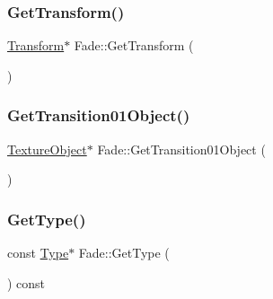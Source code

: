 \mbox{\label{class_fade_a1a177209e72a27858ceb2d339321e9c4}} 
\subsubsection{\texorpdfstring{Get\+Transform()}{GetTransform()}}
{\footnotesize\ttfamily \mbox{\hyperlink{class_transform}{Transform}}$\ast$ Fade\+::\+Get\+Transform (\begin{DoxyParamCaption}{ }\end{DoxyParamCaption})\hspace{0.3cm}{\ttfamily [inline]}}

\mbox{\label{class_fade_a4e047c532d430095e7d0d70288289a82}} 
\subsubsection{\texorpdfstring{Get\+Transition01\+Object()}{GetTransition01Object()}}
{\footnotesize\ttfamily \mbox{\hyperlink{class_texture_object}{Texture\+Object}}$\ast$ Fade\+::\+Get\+Transition01\+Object (\begin{DoxyParamCaption}{ }\end{DoxyParamCaption})\hspace{0.3cm}{\ttfamily [inline]}}

\mbox{\label{class_fade_aed5a29d39a5fd6161a9aed73d5f30870}} 
\subsubsection{\texorpdfstring{Get\+Type()}{GetType()}}
{\footnotesize\ttfamily const \mbox{\hyperlink{class_fade_ac06f27215b454aa05b93c236476d6e80}{Type}}$\ast$ Fade\+::\+Get\+Type (\begin{DoxyParamCaption}{ }\end{DoxyParamCaption}) const\hspace{0.3cm}{\ttfamily [inline]}}

\mbox{\label{class_fade_aab12848f7102a219968c86ed699a6e5d}} 
